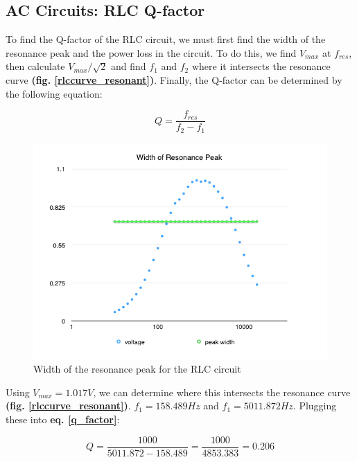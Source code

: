 \documentclass{article}
\begin{document}
\subsection{AC Circuits: RLC Q-factor}

To find the Q-factor of the RLC circuit, we must first find the width of the
resonance peak and the power loss in the circuit. To do this, we find $V_{max}$
at $f_{res}$, then calculate $V_{max}/\sqrt{2}$ and find $f_{1}$ and $f_{2}$ where it intersects the
resonance curve \textbf{(fig. \ref{rlccurve_resonant})}. Finally, the Q-factor
can be determined by the following equation:

\begin{equation}
    \label{q_factor}
    Q = \frac{f_{res}}{f_{2}-f_{1}}
\end{equation}

\begin{figure}[H]
    \centering
    \includegraphics[width=\textwidth]{charts/rlccurve_resonant_width}
    \caption{Width of the resonance peak for the RLC circuit}
    \label{rlccurve_resonant_width}
\end{figure}

Using $V_{max}=1.017V$, we can determine where this intersects the resonance
curve \textbf{(fig. \ref{rlccurve_resonant})}. $f_{1}=158.489Hz$ and
$f_{1}=5011.872Hz$. Plugging these into \textbf{eq. \ref{q_factor}}:

\begin{equation}
    \label{q_factor_1}
    Q = \frac{1000}{5011.872-158.489}=\frac{1000}{4853.383}=0.206
\end{equation}
\end{document}
